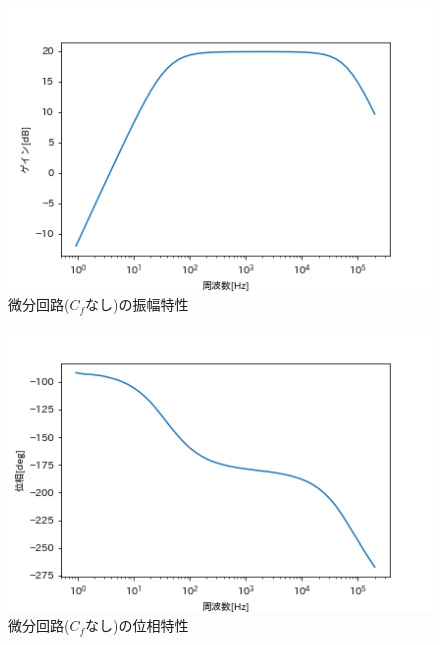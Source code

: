 \documentclass[dvipdfmx, twocolumn]{jsarticle}
\begin{document}
\begin{enumerate}
\begin{itemize}
\begin{figure}[H]
\begin{center}
\includegraphics[scale = 0.5]{dGRr.png}
\caption{微分回路($C_{f}なし$)の振幅特性}
\end{center}
\end{figure}

\begin{figure}[H]
\begin{center}
\includegraphics[scale = 0.5]{dPRr.png}
\caption{微分回路($C_{f}なし$)の位相特性}
\end{center}
\end{figure}


\end{itemize}
\end{enumerate}
\end{document}
